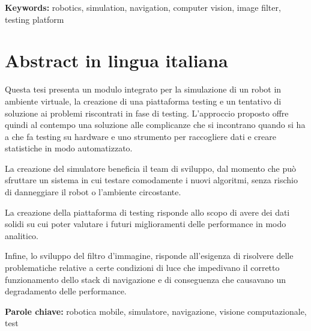 \documentclass{Configuration_Files/PoliMi3i_thesis}
\begin{document}
\textbf{Keywords:} robotics, simulation, navigation, computer vision, image filter, testing platform %

\chapter*{Abstract in lingua italiana}
Questa tesi presenta un modulo integrato per la simulazione di un robot in ambiente virtuale, la creazione di una piattaforma testing e un tentativo di soluzione ai problemi riscontrati in fase di testing. 
L'approccio proposto offre quindi al contempo una soluzione alle complicanze che si incontrano quando si ha a che fa testing su hardware e uno strumento per raccogliere dati e creare statistiche in modo automatizzato.

La creazione del simulatore beneficia il team di sviluppo, dal momento che può sfruttare  un sistema in cui testare comodamente i nuovi algoritmi, senza rischio di danneggiare il robot o l'ambiente circostante.

La creazione della piattaforma di testing risponde allo scopo di avere dei dati solidi su cui poter valutare i futuri miglioramenti delle performance in modo analitico.

Infine, lo sviluppo del filtro d'immagine, risponde all'esigenza di risolvere delle problematiche relative a certe condizioni di luce che impedivano il corretto funzionamento dello stack di navigazione e di conseguenza che causavano un degradamento delle performance.

\textbf{Parole chiave:} robotica mobile, simulatore, navigazione, visione computazionale, test


\thispagestyle{empty}
\tableofcontents %
\thispagestyle{empty}
\cleardoublepage

%
%
%    
%
\end{document}
